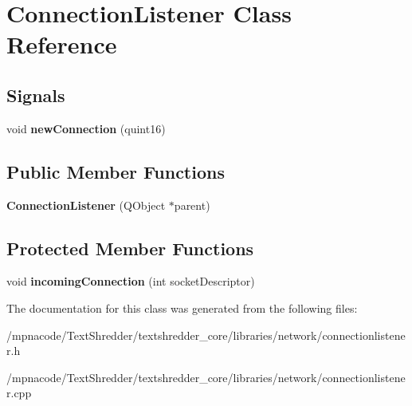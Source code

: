 \section{ConnectionListener Class Reference}
\label{class_connection_listener}
\subsection*{Signals}
\begin{DoxyCompactItemize}
\item 
void {\bfseries newConnection} (quint16)\label{class_connection_listener_a75364f505d306f8c78903d0a7ab8b389}

\end{DoxyCompactItemize}
\subsection*{Public Member Functions}
\begin{DoxyCompactItemize}
\item 
{\bfseries ConnectionListener} (QObject $\ast$parent)\label{class_connection_listener_ac65ea7c50b77acb818fcde5eb1ed810c}

\end{DoxyCompactItemize}
\subsection*{Protected Member Functions}
\begin{DoxyCompactItemize}
\item 
void {\bfseries incomingConnection} (int socketDescriptor)\label{class_connection_listener_afd6afaf343fe8f798a1dd204b903d4a0}

\end{DoxyCompactItemize}


The documentation for this class was generated from the following files:\begin{DoxyCompactItemize}
\item 
/mpnacode/TextShredder/textshredder\_\-core/libraries/network/connectionlistener.h\item 
/mpnacode/TextShredder/textshredder\_\-core/libraries/network/connectionlistener.cpp\end{DoxyCompactItemize}
